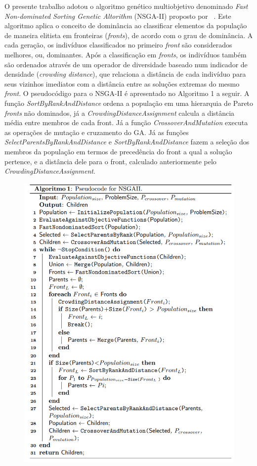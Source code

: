 \documentclass[conference]{IEEEtran}
\begin{document}
O presente trabalho adotou o algoritmo genético multiobjetivo denominado \textit{Fast Non-dominated Sorting Genetic Altorithm} (NSGA-II) proposto por ~\cite{Deb:2002}. Este algoritmo aplica o conceito de dominância ao classificar elementos da população de maneira elitista em fronteiras (\textit{fronts}), de acordo com o grau de dominância. A cada geração, os indivíduos classificados no primeiro \textit{front} são considerados melhores, ou, dominantes. Após a classificação em \textit{fronts}, os indivíduos também são ordenados através de um operador de diversidade baseado num indicador de densidade (\textit{crowding distance}), que relaciona a distância de cada indivíduo para seus vizinhos imediatos com a distância entre as soluções extremas do mesmo \textit{front}. O pseudocódigo para o NSGA-II é apresentado no Algoritmo 1 a seguir. A função \textit{SortByRankAndDistance} ordena a população em uma hierarquia de Pareto \textit{fronts} não dominados, já a \textit{CrowdingDistanceAssignment} calcula a distância média entre membros de cada front. Já a função \textit{CrossoverAndMutation} executa as operações de mutação e cruzamento do GA. Já as funções \textit{SelectParentsByRankAndDistance} e \textit{SortByRankAndDistance} fazem a seleção dos membros da população em termos de precedência do front a qual a solução pertence, e a distância dele para o front, calculado anteriormente pelo \textit{CrowdingDistanceAssignment}.

\begin{figure}[t]
  \includegraphics[scale=0.37]{figures/pseudocodigo.png}
\end{figure}
\end{document}
